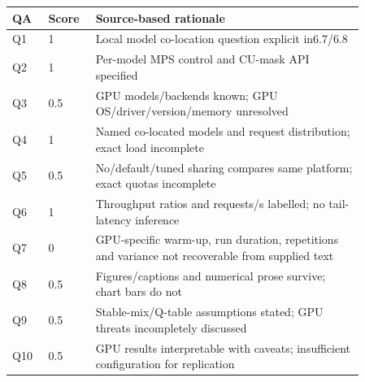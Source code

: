 \begin{longtable}{P{0.09\linewidth}P{0.10\linewidth}P{0.67\linewidth}}
\toprule QA & Score & Source-based rationale\\\midrule\endhead
Q1 & 1 & Local model co-location question explicit in6.7/6.8\\
Q2 & 1 & Per-model MPS control and CU-mask API specified\\
Q3 & 0.5 & GPU models/backends known; GPU OS/driver/version/memory unresolved\\
Q4 & 1 & Named co-located models and request distribution; exact load incomplete\\
Q5 & 0.5 & No/default/tuned sharing compares same platform; exact quotas incomplete\\
Q6 & 1 & Throughput ratios and requests/s labelled; no tail-latency inference\\
Q7 & 0 & GPU-specific warm-up, run duration, repetitions and variance not recoverable from supplied text\\
Q8 & 0.5 & Figures/captions and numerical prose survive; chart bars do not\\
Q9 & 0.5 & Stable-mix/Q-table assumptions stated; GPU threats incompletely discussed\\
Q10 & 0.5 & GPU results interpretable with caveats; insufficient configuration for replication\\
\bottomrule\end{longtable}


